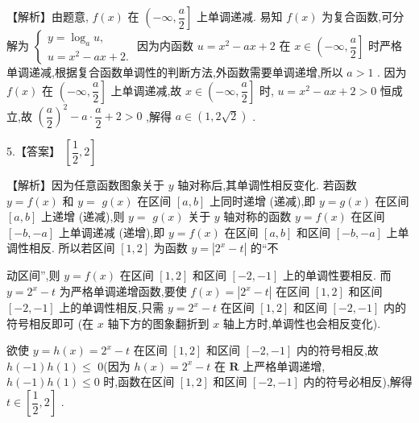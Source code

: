 \documentclass[10pt]{article}
\begin{document}
【解析】由题意, $f\left( x\right)$ 在 $\left( {-\infty ,\dfrac{a}{2}}\right\rbrack$ 上单调递减. 易知 $f\left( x\right)$ 为复合函数,可分解为 $\left\{  \begin{array}{l} y = {\log }_{a}u, \\  u = {x}^{2} - {ax} + 2. \end{array}\right.$ 因为内函数 $u = {x}^{2} - {ax} + 2$ 在 $x \in  \left( {-\infty ,\dfrac{a}{2}}\right\rbrack$ 时严格单调递减,根据复合函数单调性的判断方法,外函数需要单调递增,所以 $a > 1$ . 因为 $f\left( x\right)$ 在 $\left( {-\infty ,\dfrac{a}{2}}\right\rbrack$ 上单调递减,故 $x \in  \left( {-\infty ,\dfrac{a}{2}}\right\rbrack$ 时, $u = {x}^{2} - {ax} + 2 > 0$ 恒成立,故 ${\left( \dfrac{a}{2}\right) }^{2} - a \cdot  \dfrac{a}{2} + 2 > 0$ ,解得 $a \in  \left( {1,2\sqrt{2}}\right)$ .

5.【答案】 $\left\lbrack  {\dfrac{1}{2},2}\right\rbrack$

【解析】因为任意函数图象关于 $y$ 轴对称后,其单调性相反变化. 若函数 $y = f\left( x\right)$ 和 $y =$  $g\left( x\right)$ 在区间 $\left\lbrack  {a,b}\right\rbrack$ 上同时递增 (递减),即 $y = g\left( x\right)$ 在区间 $\left\lbrack  {a,b}\right\rbrack$ 上递增 (递减),则 $y =$  $g\left( x\right)$ 关于 $y$ 轴对称的函数 $y = f\left( x\right)$ 在区间 $\left\lbrack  {-b, - a}\right\rbrack$ 上单调递减 (递增),即 $y = f\left( x\right)$ 在区间 $\left\lbrack  {a,b}\right\rbrack$ 和区间 $\left\lbrack  {-b, - a}\right\rbrack$ 上单调性相反. 所以若区间 $\left\lbrack  {1,2}\right\rbrack$ 为函数 $y = \left| {{2}^{x} - t}\right|$ 的“不

动区间”,则 $y = f\left( x\right)$ 在区间 $\left\lbrack  {1,2}\right\rbrack$ 和区间 $\left\lbrack  {-2, - 1}\right\rbrack$ 上的单调性要相反. 而 $y = {2}^{x} - t$ 为严格单调递增函数,要使 $f\left( x\right)  = \left| {{2}^{x} - t}\right|$ 在区间 $\left\lbrack  {1,2}\right\rbrack$ 和区间 $\left\lbrack  {-2, - 1}\right\rbrack$ 上的单调性相反,只需 $y = {2}^{x} - t$ 在区间 $\left\lbrack  {1,2}\right\rbrack$ 和区间 $\left\lbrack  {-2, - 1}\right\rbrack$ 内的符号相反即可 (在 $x$ 轴下方的图象翻折到 $x$ 轴上方时,单调性也会相反变化).

欲使 $y = h\left( x\right)  = {2}^{x} - t$ 在区间 $\left\lbrack  {1,2}\right\rbrack$ 和区间 $\left\lbrack  {-2, - 1}\right\rbrack$ 内的符号相反,故 $h\left( {-1}\right) h\left( 1\right)  \leq$ 0(因为 $h\left( x\right)  = {2}^{x} - t$ 在 $\mathbf{R}$ 上严格单调递增, $h\left( {-1}\right) h\left( 1\right)  \leq  0$ 时,函数在区间 $\left\lbrack  {1,2}\right\rbrack$ 和区间 $\left\lbrack  {-2, - 1}\right\rbrack$ 内的符号必相反),解得 $t \in  \left\lbrack  {\dfrac{1}{2},2}\right\rbrack$ .
\end{document}
